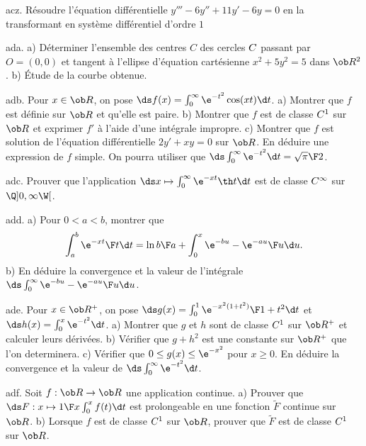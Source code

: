 \exo [Level=2,Fight=1,Learn=1,Field=\SystèmesDifférentiels,Type=\Exercices,Origin=] acz. 
Résoudre l'équation différentielle $y'''-6y''+11y'-6y=0$ 
en la transformant en système différentiel d'ordre $1$

\exo [Level=2,Fight=2,Learn=1,Field=\RepèreDeFrenet,Type=\Exercices,Origin=] ada. 
a) Déterminer l'ensemble des centres $C$ des cercles $\sc C$ passant par $O=(0,0)$ et tangent à l'ellipse 
d'équation cartésienne $x^2+5y^2=5$ dans $\ob R^2$. \pn
b) \'Etude de la courbe obtenue. 

\exo [Level=2,Fight=2,Learn=2,Field=\FonctionsDéfiniesParUneIntégrale,Type=\Exercices,Origin=] adb. 
Pour $x\in\ob R$, on pose $\ds f(x)=\int_0^\infty\e^{-t^2}\cos(xt)\d t$. \pn
a) Montrer que $f$ est définie sur $\ob R$ et qu'elle est paire. \pn
b) Montrer que $f$ est de classe $\sc C^1$ sur $\ob R$ et exprimer $f'$ à l'aide d'une intégrale impropre. \pn
c) Montrer que $f$ est solution de l'équation différentielle $2y'+xy=0$ sur $\ob R$. \pn
En déduire une expression de $f$ simple. On pourra utiliser que $\ds\int_0^\infty\e^{-t^2}\d t={\sqrt\pi\F2}$. 

\exo [Level=2,Fight=1,Learn=1,Field=\FonctionsDéfiniesParUneIntégrale,Type=\Exercices,Origin=] adc. 
Prouver que l'application $\ds x\mapsto\int_0^\infty\e^{-xt}\th t\d t$ est de classe $\sc C^\infty$ sur $\Q]0,\infty\W[$. 

\exo [Level=2,Fight=2,Learn=2,Field=\FonctionsDéfiniesParUneIntégrale,Type=\Exercices,Origin=] add. 
a) Pour $0<a<b$, montrer que 
$$
\int_a^b{\e^{-xt}\F t}\d t=\ln{b\F a}+\int_0^x{\e^{-bu}-\e^{-au}\F u}\d u.
$$
b) En déduire la convergence et la valeur de l'intégrale $\ds\int_0^\infty{\e^{-bu}-\e^{-au}\F u}\d u$. 

\exo [Level=2,Fight=1,Learn=1,Field=\FonctionsDéfiniesParUneIntégrale,Type=\Exercices,Origin=] ade. 
Pour $x\in\ob R^+$, on pose $\ds g(x)=\int_0^1{\e^{-x^2(1+t^2)}\F1+t^2}\d t$ et $\ds h(x)=\int_0^x\e^{-t^2}\d t$. \pn
a) Montrer que $g$ et $h$ sont de classe $\sc C^1$ sur $\ob R^+$ et calculer leurs dérivées. \pn
b) Vérifier que $g+h^2$ est une constante sur $\ob R^+$ que l'on determinera. \pn
c) Vérifier que $0\le g(x)\le \e^{-x^2}$ pour $x\ge0$. En déduire la convergence et la valeur de $\ds\int_0^\infty\e^{-t^2}\d t$. 

\exo [Level=2,Fight=1,Learn=1,Field=\FonctionsDéfiniesParUneIntégrale,Type=\Exercices,Origin=] adf. 
Soit $f:\ob R\to\ob R$ une application continue.  \pn
a) Prouver que $\ds F:x\mapsto {1\F x}\int_0^xf(t)\d t$ est prolongeable 
en une fonction $\tilde F$ continue sur  $\ob R$. \pn
b) Lorsque $f$ est de classe $\sc C^1$ sur $\ob R$, prouver que $\tilde F$ est de classe $\sc C^1$ sur $\ob R$. 

